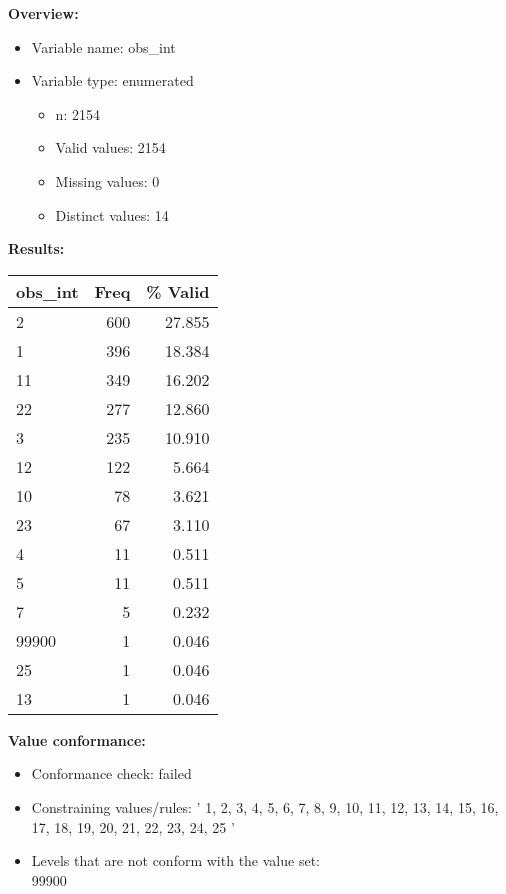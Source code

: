 \documentclass[
]{article}
\providecommand{\tightlist}{%
  \setlength{\itemsep}{0pt}\setlength{\parskip}{0pt}}
\begin{document}
\textbf{Overview:}

\begin{itemize}
\tightlist
\item
  Variable name: obs\_int
\item
  Variable type: enumerated

  \begin{itemize}
  \tightlist
  \item
    n: 2154
  \item
    Valid values: 2154
  \item
    Missing values: 0
  \item
    Distinct values: 14
  \end{itemize}
\end{itemize}

\textbf{Results:}\\

\begin{table}[H]
\centering
\begin{tabular}{l|r|r}
\hline
\textbf{obs\_int} & \textbf{Freq} & \textbf{\% Valid}\\
\hline
2 & 600 & 27.855\\
\hline
1 & 396 & 18.384\\
\hline
11 & 349 & 16.202\\
\hline
22 & 277 & 12.860\\
\hline
3 & 235 & 10.910\\
\hline
12 & 122 & 5.664\\
\hline
10 & 78 & 3.621\\
\hline
23 & 67 & 3.110\\
\hline
4 & 11 & 0.511\\
\hline
5 & 11 & 0.511\\
\hline
7 & 5 & 0.232\\
\hline
99900 & 1 & 0.046\\
\hline
25 & 1 & 0.046\\
\hline
13 & 1 & 0.046\\
\hline
\end{tabular}
\end{table}

\textbf{Value conformance:}

\begin{itemize}
\tightlist
\item
  Conformance check: failed
\item
  Constraining values/rules: ' 1, 2, 3, 4, 5, 6, 7, 8, 9, 10, 11, 12,
  13, 14, 15, 16, 17, 18, 19, 20, 21, 22, 23, 24, 25 '
\item
  Levels that are not conform with the value set:\\
  99900
\end{itemize}
\end{document}
